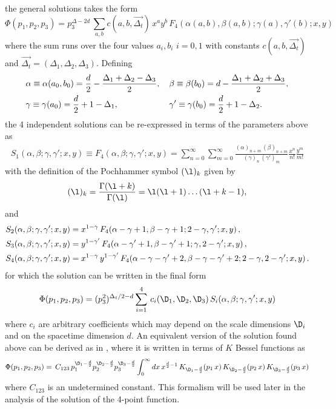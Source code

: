 \documentclass[a4paper,11pt,openright,twoside]{book}
\numberwithin{equation}{section}
\begin{document}
the general solutions takes the form 
\begin{equation}
	\Phi(p_1,p_2,p_3)=p_3^{\Delta-2 d}\, \sum_{a,b} c(a,b,\vec{\Delta_t})\,x^a y^b \,F_4(\alpha(a,b), \beta(a,b); \gamma(a), \gamma'(b); x, y)
	\label{geneq} 
\end{equation}
where the sum runs over the four values $a_i, b_i$ $i=0,1$ with constants $c(a,b,\vec{\Delta_t})$ and $\vec{\Delta_t}=(\Delta_1,\Delta_2,\Delta_3)$. Defining 
\begin{align}
	&\alpha\equiv \alpha(a_0,b_0)=\frac{d}{2}-\frac{\Delta_1 + \Delta_2 -\Delta_3}{2},\, && \beta\equiv \beta(b_0)=d-\frac{\Delta_1 + \Delta_2 +\Delta_3}{2},  \notag\\
	&\gamma \equiv \gamma(a_0) =\frac{d}{2} +1 -\Delta_1,\, &&\gamma'\equiv \gamma(b_0) =\frac{d}{2} +1 -\Delta_2.
\end{align}
the 4 independent solutions can be re-expressed in terms of the parameters above as 
\begin{align}
	\label{F4def}
	S_1(\alpha, \beta; \gamma, \gamma'; x, y)\equiv F_4(\alpha, \beta; \gamma, \gamma'; x, y) = \sum_{n = 0}^{\infty}\sum_{m = 0}^{\infty} \frac{(\alpha)_{n+m} \, 
		(\beta)_{n+m}}{(\gamma)_n \, (\gamma')_m} \frac{x^n}{n!} \frac{y^m}{m!} 
\end{align}
with the definition of the Pochhammer symbol $(\l)_{k}$ given by
\begin{equation}
	(\l)_{k}=\frac{\Gamma(\l+k)}{\Gamma(\l)}=\l(\l+1)\dots(\l+k-1),\label{Pochh}
\end{equation}
and
%
\begin{align}
	\label{solutions}
	S_2(\alpha, \beta; \gamma, \gamma'; x, y) &= x^{1-\gamma} \, F_4(\alpha-\gamma+1, \beta-\gamma+1; 2-\gamma, \gamma'; x,y) \,, \notag\\
	S_3(\alpha, \beta; \gamma, \gamma'; x, y) &= y^{1-\gamma'} \, F_4(\alpha-\gamma'+1,\beta-\gamma'+1;\gamma,2-\gamma' ; x,y) \,, \notag\\
	S_4(\alpha, \beta; \gamma, \gamma'; x, y) &= x^{1-\gamma} \, y^{1-\gamma'} \, 
	F_4(\alpha-\gamma-\gamma'+2,\beta-\gamma-\gamma'+2;2-\gamma,2-\gamma' ; x,y) \, . 
\end{align}
for which the solution can be written in the final form
\begin{equation}
	\Phi(p_1,p_2,p_3)=(p_3^2)^{\Delta_t/2- d} \sum_{i=1}^4 \,c_i(\D_1,\D_2,\D_3)\,S_i (\alpha, \beta; \gamma, \gamma'; x, y)
\end{equation}
where $c_i$ are arbitrary coefficients which may depend on the scale dimensions $\D_i$ and on the spacetime dimension $d$. An equivalent version of the solution found above can be derived as in \cite{Bzowski:2013sza}, where it is written in terms of $K$ Bessel functions as
\begin{equation}
	\label{caz}
	\Phi(p_1,p_2,p_3)=\,C_{123}\, p_1^{\D_1-\frac{d}{2}}p_2^{\D_2-\frac{d}{2}}p_3^{\D_3-\frac{d}{2}}\int_0^\infty dx\,x^{\frac{d}{2}-1}\,K_{\D_1-\frac{d}{2}}(p_1\,x)\,K_{\D_2-\frac{d}{2}}(p_2\,x)\,K_{\D_3-\frac{d}{2}}(p_3\,x)
\end{equation}
where $C_{123}$ is an undetermined constant. This formalism will be used later in the analysis of the solution of the 4-point function.
\end{document}
